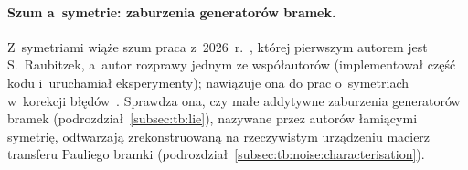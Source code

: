 \paragraph{Szum a~symetrie: zaburzenia generatorów bramek.}\label{par:lr:noise:generators}
Z~symetriami wiąże szum praca z~2026~r.~\cite{raubitzek_quantum_noise}, której pierwszym autorem jest S.~Raubitzek, a~autor rozprawy jednym ze współautorów (implementował część kodu i~uruchamiał eksperymenty); nawiązuje ona do prac o~symetriach w~korekcji błędów~\cite{Faist_2020,liu2023quantumerrorcorrectionmeets,rajput2022quantumerrorcorrectiongauge,PhysRevA.97.032323}.
Sprawdza ona, czy małe addytywne zaburzenia generatorów bramek (podrozdział~\ref{subsec:tb:lie}), nazywane przez autorów łamiącymi symetrię, odtwarzają zrekonstruowaną na rzeczywistym urządzeniu macierz transferu Pauliego bramki (podrozdział~\ref{subsec:tb:noise:characterisation}).
